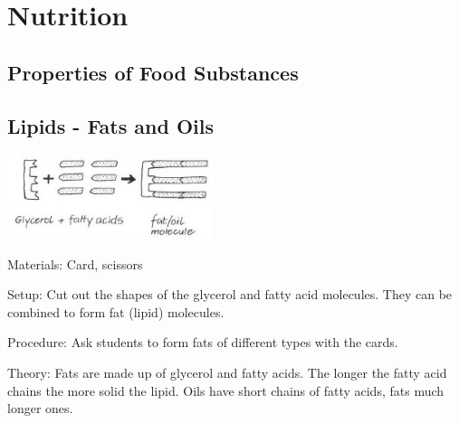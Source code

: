\section{Nutrition}

\begin{multicols}{2}




\section*{Properties of Food Substances}


\subsection{Lipids - Fats and Oils} %

\begin{center}
\includegraphics[width=0.45\textwidth]{./img/vso/lipids.jpg}
\end{center}

\begin{description*}
\item[Materials:]{Card, scissors}
\item[Setup:]{Cut out the shapes of the glycerol and fatty acid molecules. They can be
combined to form fat (lipid) molecules.}
\item[Procedure:]{Ask students to form fats of different types with the cards. }
\item[Theory:]{Fats are made up of glycerol and fatty acids. The longer the fatty acid chains
the more solid the lipid. Oils have short chains of fatty acids, fats much
longer ones.}
\end{description*}


\end{multicols}
